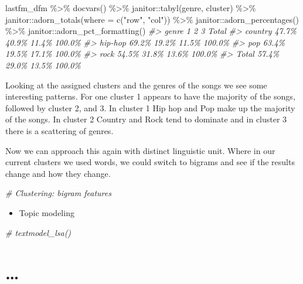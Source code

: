 \documentclass[
]{article}
\newenvironment{Shaded}{\begin{snugshade}}{\end{snugshade}}
\newcommand{\AttributeTok}[1]{\textcolor[rgb]{0.77,0.63,0.00}{#1}}
\newcommand{\CommentTok}[1]{\textcolor[rgb]{0.56,0.35,0.01}{\textit{#1}}}
\newcommand{\FunctionTok}[1]{\textcolor[rgb]{0.00,0.00,0.00}{#1}}
\newcommand{\NormalTok}[1]{#1}
\newcommand{\SpecialCharTok}[1]{\textcolor[rgb]{0.00,0.00,0.00}{#1}}
\newcommand{\StringTok}[1]{\textcolor[rgb]{0.31,0.60,0.02}{#1}}
\providecommand{\tightlist}{%
  \setlength{\itemsep}{0pt}\setlength{\parskip}{0pt}}
\begin{document}
\begin{Shaded}
\begin{Highlighting}[]
\NormalTok{lastfm\_dfm }\SpecialCharTok{\%\textgreater{}\%}
    \FunctionTok{docvars}\NormalTok{() }\SpecialCharTok{\%\textgreater{}\%}
\NormalTok{    janitor}\SpecialCharTok{::}\FunctionTok{tabyl}\NormalTok{(genre, cluster) }\SpecialCharTok{\%\textgreater{}\%}
\NormalTok{    janitor}\SpecialCharTok{::}\FunctionTok{adorn\_totals}\NormalTok{(}\AttributeTok{where =} \FunctionTok{c}\NormalTok{(}\StringTok{"row"}\NormalTok{, }\StringTok{"col"}\NormalTok{)) }\SpecialCharTok{\%\textgreater{}\%}
\NormalTok{    janitor}\SpecialCharTok{::}\FunctionTok{adorn\_percentages}\NormalTok{() }\SpecialCharTok{\%\textgreater{}\%}
\NormalTok{    janitor}\SpecialCharTok{::}\FunctionTok{adorn\_pct\_formatting}\NormalTok{()}
\CommentTok{\#\textgreater{}    genre     1     2     3  Total}
\CommentTok{\#\textgreater{}  country 47.7\% 40.9\% 11.4\% 100.0\%}
\CommentTok{\#\textgreater{}  hip{-}hop 69.2\% 19.2\% 11.5\% 100.0\%}
\CommentTok{\#\textgreater{}      pop 63.4\% 19.5\% 17.1\% 100.0\%}
\CommentTok{\#\textgreater{}     rock 54.5\% 31.8\% 13.6\% 100.0\%}
\CommentTok{\#\textgreater{}    Total 57.4\% 29.0\% 13.5\% 100.0\%}
\end{Highlighting}
\end{Shaded}

Looking at the assigned clusters and the genres of the songs we see some interesting patterns. For one cluster 1 appears to have the majority of the songs, followed by cluster 2, and 3. In cluster 1 Hip hop and Pop make up the majority of the songs. In cluster 2 Country and Rock tend to dominate and in cluster 3 there is a scattering of genres.

Now we can approach this again with distinct linguistic unit. Where in our current clusters we used words, we could switch to bigrams and see if the results change and how they change.

\begin{Shaded}
\begin{Highlighting}[]
\CommentTok{\# Clustering: bigram features}
\end{Highlighting}
\end{Shaded}

\begin{itemize}
\tightlist
\item
  Topic modeling
\end{itemize}

\begin{Shaded}
\begin{Highlighting}[]
\CommentTok{\# textmodel\_lsa()}
\end{Highlighting}
\end{Shaded}

\hypertarget{appendix-appendix}{%
\appendix}


\hypertarget{section-1}{%
\section{\ldots{}}\label{section-1}}

  
\end{document}
